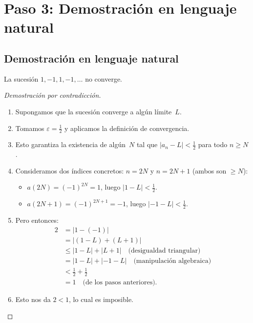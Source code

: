 \section{Paso 3: Demostración en lenguaje natural}

\subsection{Demostración en lenguaje natural}

\begin{theorem}
  La sucesión $1, -1, 1, -1, \ldots$ no converge.
\end{theorem}

\begin{proof}[Demostración por contradicción]
\mbox{}
\begin{enumerate}
  \item Supongamos que la sucesión converge a algún límite~$L$.
  \item Tomamos $\varepsilon = \tfrac{1}{2}$ y aplicamos la definición de
        convergencia.
  \item Esto garantiza la existencia de algún~$N$ tal que
        $|a_n - L| < \tfrac{1}{2}$ para todo $n \geq N$.
  \item Consideramos dos índices concretos: $n = 2N$ y $n = 2N+1$
        (ambos son $\geq N$):
        \begin{itemize}
          \item $a(2N) = (-1)^{2N} = 1$, luego $|1 - L| < \tfrac{1}{2}$.
          \item $a(2N+1) = (-1)^{2N+1} = -1$, luego $|-1 - L| < \tfrac{1}{2}$.
        \end{itemize}
  \item Pero entonces:
        \begin{align*}
          2 &= |1 - (-1)| \\
            &= |(1 - L) + (L + 1)| \\
            &\leq |1 - L| + |L + 1| \quad \text{(desigualdad triangular)} \\
            &= |1 - L| + |-1 - L| \quad \text{(manipulación algebraica)} \\
            &< \tfrac{1}{2} + \tfrac{1}{2} \\
            &= 1 \quad \text{(de los pasos anteriores).}
        \end{align*}
  \item Esto nos da $2 < 1$, lo cual es imposible. \qedhere
\end{enumerate}
\end{proof}

